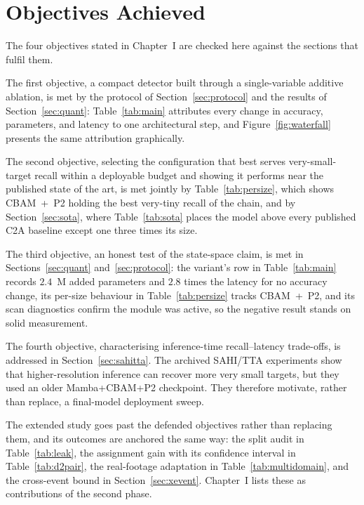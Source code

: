 \documentclass[12pt,a4paper,oneside]{report}
\begin{document}
\section{Objectives Achieved}
\label{sec:objectives}
The four objectives stated in Chapter~I are checked here against the sections
that fulfil them.

The first objective, a compact detector built through a single-variable
additive ablation, is met by the protocol of Section~\ref{sec:protocol} and
the results of Section~\ref{sec:quant}: Table~\ref{tab:main} attributes every
change in accuracy, parameters, and latency to one architectural step, and
Figure~\ref{fig:waterfall} presents the same attribution graphically.

The second objective, selecting the configuration that best serves
very-small-target recall within a deployable budget and showing it performs
near the published state of the art, is met jointly by
Table~\ref{tab:persize}, which shows CBAM~+~P2 holding the best very-tiny
recall of the chain, and by Section~\ref{sec:sota}, where
Table~\ref{tab:sota} places the model above every published C2A baseline
except one three times its size.

The third objective, an honest test of the state-space claim, is met in
Sections~\ref{sec:quant} and~\ref{sec:protocol}: the variant's row in
Table~\ref{tab:main} records $2.4$~M added parameters and $2.8$ times the
latency for no accuracy change, its per-size behaviour in
Table~\ref{tab:persize} tracks CBAM~+~P2, and its scan diagnostics confirm
the module was active, so the negative result stands on solid measurement.

The fourth objective, characterising inference-time recall--latency trade-offs,
is addressed in Section~\ref{sec:sahitta}. The archived SAHI/TTA experiments
show that higher-resolution inference can recover more very small targets, but
they used an older Mamba+CBAM+P2 checkpoint. They therefore motivate, rather
than replace, a final-model deployment sweep.

The extended study goes past the defended objectives rather than replacing
them, and its outcomes are anchored the same way: the split audit in
Table~\ref{tab:leak}, the assignment gain with its confidence interval in
Table~\ref{tab:d2pair}, the real-footage adaptation in
Table~\ref{tab:multidomain}, and the cross-event bound in
Section~\ref{sec:xevent}. Chapter~I lists these as contributions of the
second phase.
\end{document}
